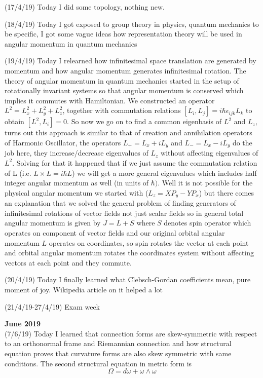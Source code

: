 \documentclass[12pt,a4paper]{article}
\begin{document}
(17/4/19) Today I did some topology, nothing new.

(18/4/19) Today I got exposed to group theory in physics, quantum mechanics to be specific, I got some vague ideas how representation theory will be used in angular momentum in quantum mechanics

(19/4/19) Today I relearned how infinitesimal space translation are generated by momentum and how angular momentum generates infinitesimal rotation. The theory of angular momentum in quantum mechanics started in the setup of rotationally invariant systems so that angular momentum is conserved which implies it commutes with Hamiltonian. We constructed an operator $L^2=L_x^2+L_y^2+L_z^2$, together with commutation relations $[L_i,L_j]=i\hbar\epsilon_{ijk}L_k$ to obtain $[L^2,L_i]=0$. So now we go on to find a common eigenbasis of $L^2$ and $L_z$, turns out this approach is similar to that of creation and annihilation operators of Harmonic Oscillator, the operators $L_+=L_x+iL_y$ and $L_-=L_x-iL_y$ do the job here, they increase/decrease eigenvalues of $L_z$ without affecting eigenvalues of $L^2$. Solving for that it happened that if we just assume the commutation relation of L (i.e. $L\times L=i\hbar L$) we will get a more general eigenvalues which includes half integer angular momentum as well (in units of $\hbar)$. Well it is not possible for the physical angular momentum we started with ($L_z=XP_y-YP_x$) but there comes an explanation that we solved the general problem of finding generators of infinitesimal rotations of vector fields not just scalar fields so in general total angular momentum is given by $J=L+S$ where $S$ denotes spin operator which operates on component of vector fields and our original orbital angular momentum $L$ operates on coordinates, so spin rotates the vector at each point and orbital angular momentum rotates the coordinates system without affecting vectors at each point and they commute.

(20/4/19) Today I finally learned what Clebsch-Gordan coefficients mean, pure moment of joy. Wikipedia article on it helped a lot

(21/4/19-27/4/19) Exam week
\\


\maketitle\textbf{June 2019} 
\\


(7/6/19) Today I learned that connection forms are skew-symmetric with respect to an orthonormal frame and Riemannian connection and how structural equation proves that curvature forms are also skew symmetric with same conditions.
The second structural equation in metric form is $$\Omega =d\omega+\omega\wedge \omega$$
\end{document}
